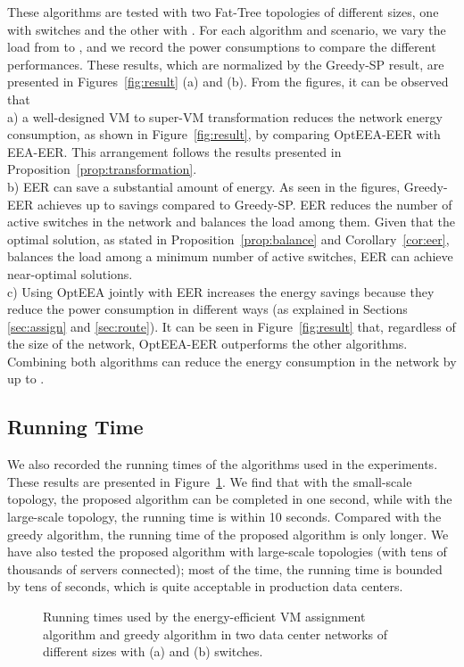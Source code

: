 \documentclass[journal,single-space,two column,twoside,10pt]{IEEEtran}
\begin{document}
These algorithms are tested with two Fat-Tree topologies of different sizes, one with  switches and the other with . For each algorithm and scenario, we vary the load from  to , and we record the power consumptions to compare the different performances. These results, which are normalized by the Greedy-SP result, are presented in Figures~\ref{fig:result} (a) and (b). From the figures, it can be observed that \\
a) a well-designed VM to super-VM transformation reduces the network energy consumption, as shown in Figure~\ref{fig:result}, by comparing OptEEA-EER with EEA-EER. This arrangement follows the results presented in Proposition~\ref{prop:transformation}. \\
b) EER can save a substantial amount of energy. As seen in the figures, Greedy-EER achieves up to  savings compared to Greedy-SP. EER reduces the number of active switches in the network and balances the load among them. Given that the optimal solution, as stated in Proposition~\ref{prop:balance} and Corollary~\ref{cor:eer}, balances the load among a minimum number of active switches, EER can achieve near-optimal solutions. \\
c) Using OptEEA jointly with EER increases the energy savings because they reduce the power consumption in different ways (as explained in Sections \ref{sec:assign} and \ref{sec:route}). It can be seen in Figure~\ref{fig:result} that, regardless of the size of the network, OptEEA-EER outperforms the other algorithms. Combining both algorithms can reduce the energy consumption in the network by up to .


\subsection{Running Time}

We also recorded the running times of the algorithms used in the experiments. These results are presented in Figure~\ref{fig:time}. We find that with the small-scale topology, the proposed algorithm can be completed in one second, while with the large-scale topology, the running time is within 10 seconds. Compared with the greedy algorithm, the running time of the proposed algorithm is only  longer. We have also tested the proposed algorithm with large-scale topologies (with tens of thousands of servers connected); most of the time, the running time is bounded by tens of seconds, which is quite acceptable in production data centers.

\begin{figure}[!t]
	\centering
	\hspace{-0.3in}
	\caption{\label{fig:time}Running times used by the energy-efficient VM assignment algorithm and greedy algorithm in two data center networks of different sizes with (a)  and (b)  switches.}
\end{figure} 
\end{document}
